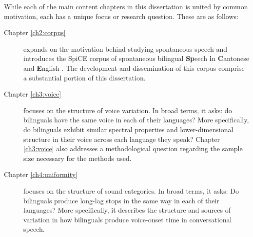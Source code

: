 While each of the main content chapters in this dissertation is united by common motivation, each has a unique focus or research question. These are as follows:

\begin{description}
    \item[Chapter \ref{ch2:corpus}] expands on the motivation behind studying spontaneous speech and introduces the SpiCE corpus of spontaneous bilingual \textbf{Sp}eech \textbf{i}n \textbf{C}antonese and \textbf{E}nglish \citep{johnson_2021_spice}. The development and dissemination of this corpus comprise a substantial portion of this dissertation.
    \item[Chapter \ref{ch3:voice}] focuses on the structure of voice variation. In broad terms, it asks: do bilinguals have the same voice in each of their languages? More specifically, do bilinguals exhibit similar spectral properties and lower-dimensional structure in their voice across each language they speak? Chapter \ref{ch3:voice} also addresses a methodological question regarding the sample size necessary for the methods used. 
    \item[Chapter \ref{ch4:uniformity}] focuses on the structure of sound categories. In broad terms, it asks: Do bilinguals produce long-lag stops in the same way in each of their languages? More specifically, it describes the structure and sources of variation in how bilinguals produce voice-onset time in conversational speech.
\end{description}

\endinput %
